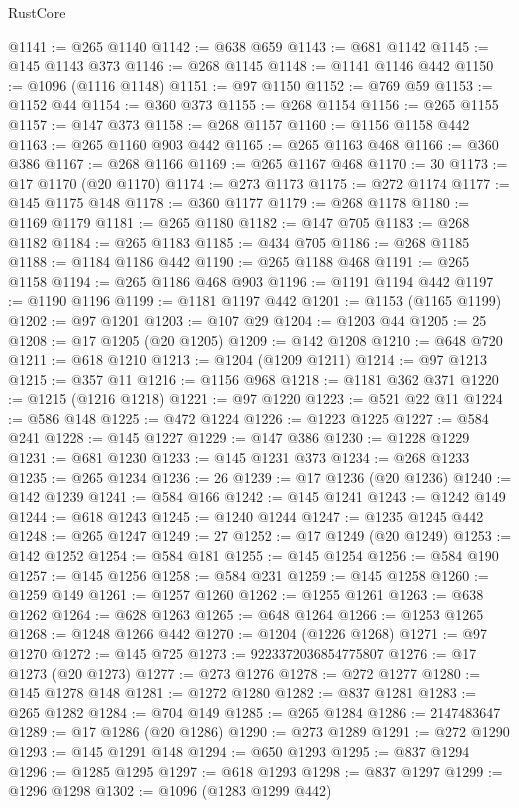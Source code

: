 \begin{lexlean}{RustCore}
\begin{coremodule}
@1141 := @265 @1140
@1142 := @638 @659
@1143 := @681 @1142
@1145 := @145 @1143 @373
@1146 := @268 @1145
@1148 := @1141 @1146 @442
@1150 := @1096 (@1116 @1148)
@1151 := @97 @1150
@1152 := @769 @59
@1153 := @1152 @44
@1154 := @360 @373
@1155 := @268 @1154
@1156 := @265 @1155
@1157 := @147 @373
@1158 := @268 @1157
@1160 := @1156 @1158 @442
@1163 := @265 @1160 @903 @442
@1165 := @265 @1163 @468
@1166 := @360 @386
@1167 := @268 @1166
@1169 := @265 @1167 @468
@1170 := 30
@1173 := @17 @1170 (@20 @1170)
@1174 := @273 @1173
@1175 := @272 @1174
@1177 := @145 @1175 @148
@1178 := @360 @1177
@1179 := @268 @1178
@1180 := @1169 @1179
@1181 := @265 @1180
@1182 := @147 @705
@1183 := @268 @1182
@1184 := @265 @1183
@1185 := @434 @705
@1186 := @268 @1185
@1188 := @1184 @1186 @442
@1190 := @265 @1188 @468
@1191 := @265 @1158
@1194 := @265 @1186 @468 @903
@1196 := @1191 @1194 @442
@1197 := @1190 @1196
@1199 := @1181 @1197 @442
@1201 := @1153 (@1165 @1199)
@1202 := @97 @1201
@1203 := @107 @29
@1204 := @1203 @44
@1205 := 25
@1208 := @17 @1205 (@20 @1205)
@1209 := @142 @1208
@1210 := @648 @720
@1211 := @618 @1210
@1213 := @1204 (@1209 @1211)
@1214 := @97 @1213
@1215 := @357 @11
@1216 := @1156 @968
@1218 := @1181 @362 @371
@1220 := @1215 (@1216 @1218)
@1221 := @97 @1220
@1223 := @521 @22 @11
@1224 := @586 @148
@1225 := @472 @1224
@1226 := @1223 @1225
@1227 := @584 @241
@1228 := @145 @1227
@1229 := @147 @386
@1230 := @1228 @1229
@1231 := @681 @1230
@1233 := @145 @1231 @373
@1234 := @268 @1233
@1235 := @265 @1234
@1236 := 26
@1239 := @17 @1236 (@20 @1236)
@1240 := @142 @1239
@1241 := @584 @166
@1242 := @145 @1241
@1243 := @1242 @149
@1244 := @618 @1243
@1245 := @1240 @1244
@1247 := @1235 @1245 @442
@1248 := @265 @1247
@1249 := 27
@1252 := @17 @1249 (@20 @1249)
@1253 := @142 @1252
@1254 := @584 @181
@1255 := @145 @1254
@1256 := @584 @190
@1257 := @145 @1256
@1258 := @584 @231
@1259 := @145 @1258
@1260 := @1259 @149
@1261 := @1257 @1260
@1262 := @1255 @1261
@1263 := @638 @1262
@1264 := @628 @1263
@1265 := @648 @1264
@1266 := @1253 @1265
@1268 := @1248 @1266 @442
@1270 := @1204 (@1226 @1268)
@1271 := @97 @1270
@1272 := @145 @725
@1273 := 9223372036854775807
@1276 := @17 @1273 (@20 @1273)
@1277 := @273 @1276
@1278 := @272 @1277
@1280 := @145 @1278 @148
@1281 := @1272 @1280
@1282 := @837 @1281
@1283 := @265 @1282
@1284 := @704 @149
@1285 := @265 @1284
@1286 := 2147483647
@1289 := @17 @1286 (@20 @1286)
@1290 := @273 @1289
@1291 := @272 @1290
@1293 := @145 @1291 @148
@1294 := @650 @1293
@1295 := @837 @1294
@1296 := @1285 @1295
@1297 := @618 @1293
@1298 := @837 @1297
@1299 := @1296 @1298
@1302 := @1096 (@1283 @1299 @442)

\end{coremodule}
\end{lexlean}
